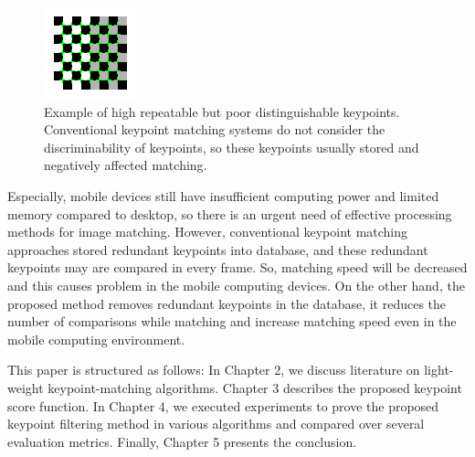 \begin{figure}[ht!]
\centering
\includegraphics[width=0.5\columnwidth]{1_introduction/checkerboard}
\caption{Example of high repeatable but poor distinguishable keypoints. Conventional keypoint matching systems do not consider the discriminability of keypoints, so these keypoints usually stored and negatively affected matching.}
\label{fig:example_of_bad_features}
\end{figure}

Especially, mobile devices still have insufficient computing power and limited memory compared to desktop, so there is an urgent need of effective processing methods for image matching. However, conventional keypoint matching approaches stored redundant keypoints into database, and these redundant keypoints may are compared in every frame. So, matching speed will be decreased and this causes problem in the mobile computing devices. On the other hand, the proposed method removes redundant keypoints in the database, it reduces the number of comparisons while matching and increase matching speed even in the mobile computing environment.

This paper is structured as follows: In Chapter 2, we discuss literature on light-weight keypoint-matching algorithms. Chapter 3 describes the proposed keypoint score function. In Chapter 4, we executed experiments to prove the proposed keypoint filtering method in various algorithms and compared over several evaluation metrics. Finally, Chapter 5 presents the conclusion.
